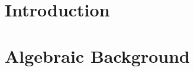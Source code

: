 








\begin{Preface}

%
%
%
%
%
%


%
%


\tableofcontents

\end{Preface}


\pagestyle{fancyplain}




\chapter{Introduction} 
\label{chap:intro} 
\singlespacing


\mediumspacing

\chapter{Algebraic Background} 
\label{chap:algbackground} 
\singlespacing


